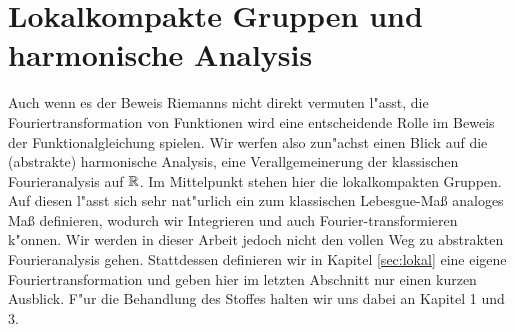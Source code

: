 \section{Lokalkompakte Gruppen und harmonische Analysis}\label{sec:topogroup}
	Auch wenn es der Beweis Riemanns nicht direkt vermuten l"asst, die Fouriertransformation von Funktionen wird eine entscheidende Rolle im Beweis der Funktionalgleichung spielen.
	Wir werfen also zun"achst einen Blick auf die (abstrakte) harmonische Analysis, eine Verallgemeinerung der klassischen Fourieranalysis auf $\mathbb{R}$.
	Im Mittelpunkt stehen hier die lokalkompakten Gruppen.
	Auf diesen l"asst sich sehr nat"urlich ein zum klassischen Lebesgue-Maß analoges Maß definieren, wodurch wir Integrieren und auch Fourier-transformieren k"onnen.
	Wir werden in dieser Arbeit jedoch nicht den vollen Weg zu abstrakten Fourieranalysis gehen.
	Stattdessen definieren wir in Kapitel \ref{sec:lokal} eine eigene Fouriertransformation und geben hier im letzten Abschnitt nur einen kurzen Ausblick.
	F"ur die Behandlung des Stoffes halten wir uns dabei an \textcite{rama} Kapitel 1 und 3.
